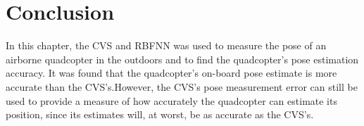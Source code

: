 
\section{Conclusion}

In this chapter, the CVS and RBFNN was used to measure the pose of an airborne quadcopter in the outdoors and to find the quadcopter's pose estimation accuracy. It was found that the quadcopter's on-board pose estimate is more accurate than the CVS's.\@ However, the CVS's pose measurement error can still be used to provide a measure of how accurately the quadcopter can estimate its position, since its estimates will, at worst, be as accurate as the CVS's.\@ 
